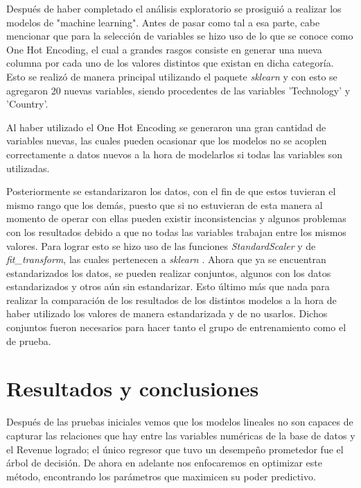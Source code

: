 \documentclass{article}
\begin{document}
        Después de haber completado el análisis exploratorio se prosiguió a realizar los modelos de "machine learning". Antes de pasar como tal a esa parte, cabe mencionar que para la selección de variables se hizo uso de lo que se conoce como One Hot Encoding, el cual a grandes rasgos consiste en generar una nueva columna por cada uno de los valores distintos que existan en dicha categoría. Esto se realizó de manera principal utilizando el paquete \emph{sklearn} y con esto se agregaron 20 nuevas variables, siendo procedentes de las variables 'Technology' y 'Country'.

        \vspace{4mm}

        Al haber utilizado el One Hot Encoding se generaron una gran cantidad de variables nuevas, las cuales pueden ocasionar que los modelos no se acoplen correctamente a datos nuevos a la hora de modelarlos si todas las variables son utilizadas.

        \vspace{4mm}

        Posteriormente se estandarizaron los datos, con el fin de que estos tuvieran el mismo rango que los demás, puesto que si no estuvieran de esta manera al momento de operar con ellas pueden existir inconsistencias y algunos problemas con los resultados debido a que no todas las variables trabajan entre los mismos valores. Para lograr esto se hizo uso de las funciones \emph{StandardScaler} y de \emph{fit\_transform}, las cuales pertenecen a \emph{sklearn} \parencite{scikit-learn}. Ahora que ya se encuentran estandarizados los datos, se pueden realizar conjuntos, algunos con los datos estandarizados y otros aún sin estandarizar. Esto último más que nada para realizar la comparación de los resultados de los distintos modelos a la hora de haber utilizado los valores de manera estandarizada y de no usarlos. Dichos conjuntos fueron necesarios para hacer tanto el grupo de entrenamiento como el de prueba.

    \section{Resultados y conclusiones}
        Después de las pruebas iniciales vemos que los modelos lineales no son capaces de capturar las relaciones que hay entre las variables numéricas de la base de datos y el Revenue logrado; el único regresor que tuvo un desempeño prometedor fue el árbol de decisión. De ahora en adelante nos enfocaremos en optimizar este método, encontrando los parámetros que maximicen su poder predictivo.
\end{document}
